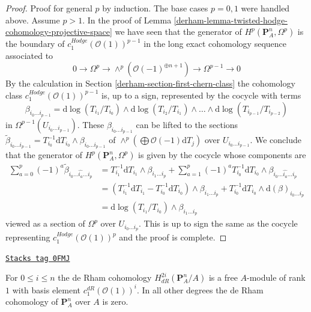 \begin{proof}
\medskip\noindent
Proof for general $p$ by induction. The base cases $p = 0, 1$ were handled
above. Assume $p > 1$. In the proof of
Lemma \ref{derham-lemma-twisted-hodge-cohomology-projective-space}
we have seen that the generator of $H^p(\mathbf{P}^n_A, \Omega^p)$
is the boundary of $c_1^{Hodge}(\mathcal{O}(1))^{p - 1}$
in the long exact cohomology sequence associated to
$$
0 \to \Omega^p \to \wedge^p\left(\mathcal{O}(-1)^{\oplus n + 1}\right)
\to \Omega^{p - 1} \to 0
$$
By the calculation in Section \ref{derham-section-first-chern-class}
the cohomology class $c_1^{Hodge}(\mathcal{O}(1))^{p - 1}$
is, up to a sign, represented by the cocycle with terms
$$
\beta_{i_0 \ldots i_{p - 1}} =
\text{d}\log(T_{i_1}/T_{i_0}) \wedge
\text{d}\log(T_{i_2}/T_{i_1}) \wedge \ldots \wedge
\text{d}\log(T_{i_{p - 1}}/T_{i_{p - 2}})
$$
in $\Omega^{p - 1}(U_{i_0 \ldots i_{p - 1}})$. These
$\beta_{i_0 \ldots i_{p - 1}}$ can be lifted to the sections
$\tilde \beta_{i_0 \ldots i_{p -1}} =
T_{i_0}^{-1}\text{d}T_{i_0} \wedge \beta_{i_0 \ldots i_{p - 1}}$
of $\wedge^p(\bigoplus \mathcal{O}(-1) \text{d}T_j)$ over
$U_{i_0 \ldots i_{p - 1}}$. We conclude that the generator of
$H^p(\mathbf{P}^n_A, \Omega^p)$ is given by the cocycle whose
components are
\begin{align*}
\sum\nolimits_{a = 0}^p (-1)^a
\tilde \beta_{i_0 \ldots \hat{i_a} \ldots i_p}
& =
T_{i_1}^{-1}\text{d}T_{i_1} \wedge \beta_{i_1 \ldots i_p}
+ \sum\nolimits_{a = 1}^p (-1)^a
T_{i_0}^{-1}\text{d}T_{i_0} \wedge
\beta_{i_0 \ldots \hat{i_a} \ldots i_p} \\
& =
(T_{i_1}^{-1}\text{d}T_{i_1} - T_{i_0}^{-1}\text{d}T_{i_0}) \wedge
\beta_{i_1 \ldots i_p} +
T_{i_0}^{-1}\text{d}T_{i_0} \wedge \text{d}(\beta)_{i_0 \ldots i_p} \\
& =
\text{d}\log(T_{i_1}/T_{i_0}) \wedge \beta_{i_1 \ldots i_p}
\end{align*}
viewed as a section of $\Omega^p$ over $U_{i_0 \ldots i_p}$.
This is up to sign the same as the cocycle representing
$c_1^{Hodge}(\mathcal{O}(1))^p$ and the proof is complete.
\end{proof}

\begin{lemma}
\label{derham-lemma-de-rham-cohomology-projective-space}
\href{https://stacks.math.columbia.edu/tag/0FMJ}{\texttt{Stacks tag 0FMJ}}

For $0 \leq i \leq n$ the de Rham cohomology
$H^{2i}_{dR}(\mathbf{P}^n_A/A)$ is a free $A$-module of rank $1$
with basis element $c_1^{dR}(\mathcal{O}(1))^i$.
In all other degrees the de Rham cohomology of $\mathbf{P}^n_A$
over $A$ is zero.
\end{lemma}

